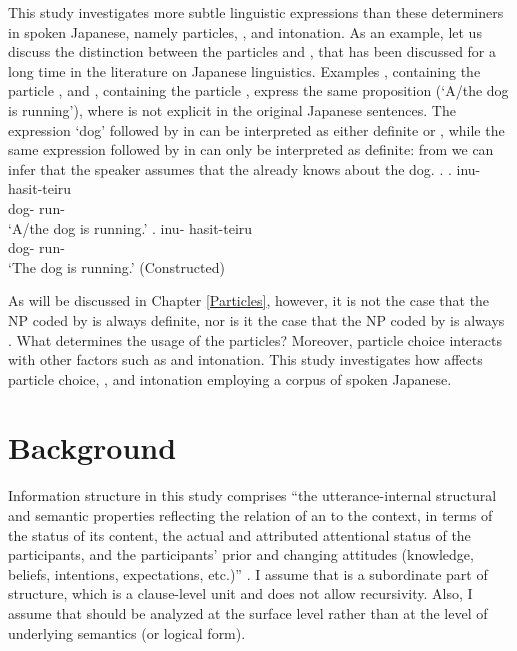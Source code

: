 This study investigates more subtle linguistic expressions than these determiners in spoken Japanese, namely
particles, , and intonation.
As an example, let us discuss
the distinction between the particles  and ,
that has been discussed for a long time in the literature on Japanese linguistics.
Examples \Next[a], containing the particle , and \Next[b], containing the particle ,
express the same proposition (`A/the dog is running'),
where  is not explicit in the original Japanese sentences.
The expression  `dog' followed by  in \Next[a]
can be interpreted as either definite or ,
while the same expression followed by  in \Next[b]
can only be interpreted as definite:
from \Next[b] we can infer that the speaker assumes that the  already knows about the dog.
%
\ex.
 \ag. inu- hasit-teiru \\
      dog- run- \\
      `A/the dog is running.'
 \bg. inu- hasit-teiru \\
      dog- run- \\
      `The dog is running.'
 \hfill{(Constructed)}

As will be discussed in Chapter \ref{Particles},
however,
it is not the case that
the NP coded by  is always definite,
nor is it the case that
the NP coded by  is always .
What determines the usage of the particles?
Moreover,
particle choice interacts with other factors such as
 and intonation.
This study investigates how  affects
particle choice, , and intonation
employing a corpus of spoken Japanese.

\section{Background}\label{IntroBackground}

Information structure in this study comprises
``the utterance-internal structural and semantic properties reflecting the relation of an  to the  context,
in terms of the  status of its content,
the actual and attributed attentional status of the  participants,
and the participants' prior and changing attitudes
(knowledge, beliefs, intentions, expectations, etc.)''
\cite[250]{kruijff-korbayovasteedman03}.
I assume that
 is a subordinate part of  structure,
which is a clause-level unit and does not allow recursivity.
Also, I assume that  should be analyzed at the surface level rather than at the level of underlying semantics (or logical form).


